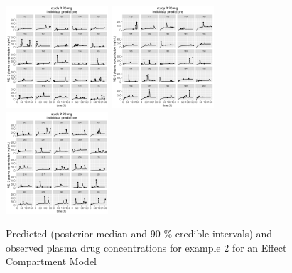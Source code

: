 \documentclass[11pt]{amsart}
\begin{document}
\begin{figure}[htbp]
\includegraphics[width=1.5in,trim=0in 0in 0 0in]{graphics/effCptModelTorsten/effCptModelTorstenPlots016.pdf}
\includegraphics[width=1.5in,trim=0in 0in 0 0in]{graphics/effCptModelTorsten/effCptModelTorstenPlots017.pdf}
\includegraphics[width=1.5in,trim=0in 0in 0 0in]{graphics/effCptModelTorsten/effCptModelTorstenPlots018.pdf}
\caption{{Predicted (posterior median and 90 \% credible intervals) and observed plasma drug concentrations for example 2 for an Effect Compartment Model}}
\label{effCptModelPredictionsPK}
\end{figure}
\end{document}
